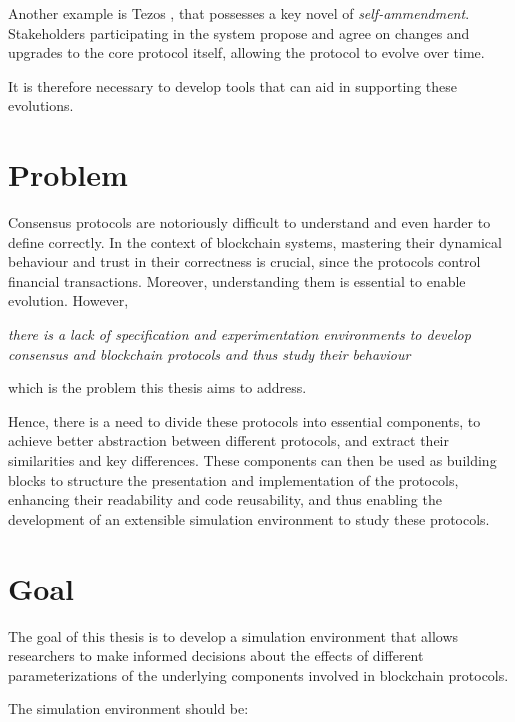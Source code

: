 Another example is Tezos \cite{tezos}, that possesses a key novel of \textit{self-ammendment}. Stakeholders participating in the system propose and agree on changes and upgrades to the core protocol itself, allowing the protocol to evolve over time. 

It is therefore necessary to develop tools that can aid in supporting these evolutions.




\section{Problem}

Consensus protocols are notoriously difficult to understand and even harder to define correctly. In the context of blockchain systems, mastering their dynamical behaviour and trust in their correctness is crucial, since the protocols control financial transactions. Moreover, understanding them is essential to enable evolution. However,

\begin{center}
  \emph{there is a lack of specification and experimentation environments to develop consensus and blockchain protocols and thus study their behaviour}
\end{center}

\noindent which is the problem this thesis aims to address.

Hence, there is a need to divide these protocols into essential components, to achieve better abstraction between different protocols, and extract their similarities and key differences. These components can then be used as building blocks to structure the presentation and implementation of the protocols, enhancing their readability and code reusability, and thus enabling the development of an extensible simulation environment to study these protocols.

\section{Goal}

The goal of this thesis is to develop a simulation environment that allows researchers to make informed decisions about the effects of different parameterizations of the underlying components involved in blockchain protocols.

The simulation environment should be:

